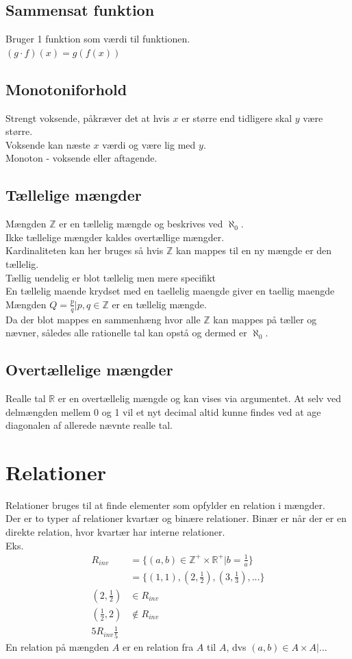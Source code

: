 \documentclass[12pt, a4paper]{article}
\begin{document}
				\subsection{Sammensat funktion}
					Bruger 1 funktion som værdi til funktionen.\\
					$(g\cdot f)(x)=g(f(x))$
				\subsection{Monotoniforhold}
					Strengt voksende, påkræver det at hvis $x$ er større end tidligere skal $y$ være større.\\
					Voksende kan næste $x$ værdi og være lig med $y$.\\
					Monoton - voksende eller aftagende.
				\subsection{Tællelige mængder}
					Mængden $\mathbb{Z}$ er en tællelig mængde og beskrives ved $\aleph_0$.\\
					Ikke tællelige mængder kaldes overtællige mængder.\\
					Kardinaliteten kan her bruges så hvis $\mathbb{Z}$ kan mappes til en ny mængde er den tællelig.\\
					Tællig uendelig er blot tællelig men mere specifikt\\
					En tællelig maende krydset med en taellelig maengde giver en taellig maengde\\
					Mængden $Q = {\frac{p}{q}|p,q\in \mathbb{Z}}$ er en tællelig mængde.\\
					Da der blot mappes en sammenhæng hvor alle $\mathbb{Z}$ kan mappes på tæller og nævner, således alle rationelle tal kan opstå og dermed er $\aleph_0$.
				\subsection{Overtællelige mængder}
					Realle tal $\mathbb{R}$ er en overtællelig mængde og kan vises via argumentet. At selv ved delmængden mellem 0 og 1 vil et nyt decimal altid kunne findes ved at age diagonalen af allerede nævnte realle tal.
			\section{Relationer}
				Relationer bruges til at finde elementer som opfylder en relation i mængder.\\
				Der er to typer af relationer kvartær og binære relationer. Binær er når der er en direkte relation, hvor kvartær har interne relationer.\\
				Eks. 
				\begin{align*}
					R_{inv}&=\{(a,b)\in \mathbb{Z}^+\times\mathbb{R}^+|b=\frac{1}{a}\}\\
					&=\{(1,1),(2,\frac{1}{2}),(3,\frac{1}{3}),...\}\\
					(2,\frac{1}{2})&\in R_{inv}\\
					(\frac{1}{2},2)&\notin R_{inv}\\
					5R_{inv}\frac{1}{5}
				\end{align*}
				En relation på mængden $A$  er en relation fra $A$ til $A$, dvs $(a,b)\in A\times A|...$
\end{document}
